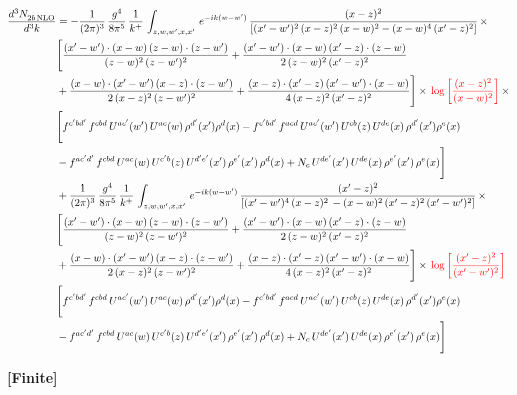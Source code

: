 \documentclass[9pt]{article}
\numberwithin{equation}{section}
\begin{document}
\begin{align}
    \frac{d^{3}N_{2b\,\rm NLO}^{\rm}}{d^{3}k}  & =  - \frac{1}{(2\pi)^{3}}\, \frac{g^{4}}{8\pi^{5}}\,\frac{1}{k^{+}}\,\int_{z,w,w^{\prime},x,x'}\, e^{-ik(w-w^{\prime})}\, \frac{(x-z)^{2}}{\left[(x'-w')^{2}\,(x-z)^{2}\,(x-w)^{2} - (x-w)^{4}\, (x'-z)^{2}\right]}\,  \times\notag \\ & \Bigg[\frac{(x'-w')\cdot (x-w)\, (z-w)\cdot (z-w')}{(z-w)^{2}\, (z-w')^{2}}+\frac{(x'-w')\cdot (x-w)\, (x'-z)\cdot (z-w)}{2\, (z-w)^{2}\, (x'-z)^{2}}\notag \\ & +\frac{(x-w)\cdot (x'-w')\, (x-z)\cdot (z-w')}{2\, (x-z)^{2}\, (z-w')^{2}}+\frac{(x-z)\cdot (x'-z)\, (x'-w')\cdot (x-w)}{4\, (x-z)^{2}\, (x'-z)^{2}}\Bigg] \times\,{\color{red}\log{\left[\frac{(x-z)^{2}}{(x-w)^{2}}\right]}}\,\times \notag \\ & \Bigg[f^{c'bd'}\,f^{cbd}\, U^{ac'}(w')\,U^{ac}(w)\,\rho^{d'}(x')\rho^{d}(x)- f^{c'bd'}\,f^{acd}\,U^{ac'}(w')\,U^{cb}(z)\,U^{de}(x)\,\rho^{d'}(x')\rho^{e}(x) \notag \\ & -f^{ac'd'}\,f^{cbd}\,U^{ac}(w)\,U^{c'b}(z)\,U^{d'e'}(x')\,\rho^{e'}(x')\,\rho^{d}(x) +N_{c}\,U^{de'}(x')\,U^{de}(x)\,\rho^{e'}(x')\,\rho^{e}(x)\Bigg] \notag \\
&  + \frac{1}{(2\pi)^{3}}\, \frac{g^{4}}{8\pi^{5}}\,\frac{1}{k^{+}}\,\int_{z,w,w^{\prime},x,x'}\, e^{-ik(w-w^{\prime})}\, \frac{(x'-z)^{2}}{\left[(x'-w')^{4}\,(x-z)^{2}\, - (x-w)^{2}\, (x'-z)^{2}\,(x'-w')^{2}\right]}\,  \times\notag \\ & \Bigg[\frac{(x'-w')\cdot (x-w)\, (z-w)\cdot (z-w')}{(z-w)^{2}\, (z-w')^{2}}+\frac{(x'-w')\cdot (x-w)\, (x'-z)\cdot (z-w)}{2\, (z-w)^{2}\, (x'-z)^{2}}\notag \\ & +\frac{(x-w)\cdot (x'-w')\, (x-z)\cdot (z-w')}{2\, (x-z)^{2}\, (z-w')^{2}}+\frac{(x-z)\cdot (x'-z)\, (x'-w')\cdot (x-w)}{4\, (x-z)^{2}\, (x'-z)^{2}}\Bigg] \times\,{\color{red}\log{\left[\frac{(x'-z)^{2}}{(x'-w')^{2}}\right]}} \notag \\ & \Bigg[f^{c'bd'}\,f^{cbd}\, U^{ac'}(w')\,U^{ac}(w)\,\rho^{d'}(x')\rho^{d}(x)- f^{c'bd'}\,f^{acd}\,U^{ac'}(w')\,U^{cb}(z)\,U^{de}(x)\,\rho^{d'}(x')\rho^{e}(x) \notag \\ & -f^{ac'd'}\,f^{cbd}\,U^{ac}(w)\,U^{c'b}(z)\,U^{d'e'}(x')\,\rho^{e'}(x')\,\rho^{d}(x) +N_{c}\,U^{de'}(x')\,U^{de}(x)\,\rho^{e'}(x')\,\rho^{e}(x)\Bigg]
\end{align}
\par\smallskip\noindent\textbf{[Finite]}\par\nobreak
\end{document}
